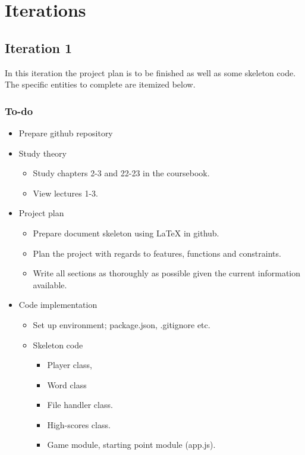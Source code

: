 \documentclass[12pt, letterpaper]{article}
\begin{document}
\section{Iterations}
\subsection{Iteration 1}

In this iteration the project plan is to be finished as well as some skeleton code. The specific entities to complete are itemized below.
\subsubsection{To-do}
\begin{itemize}
	\item Prepare github repository
	\item Study theory
	\begin{itemize}
		\item Study chapters 2-3 and 22-23 in the coursebook.
		\item View lectures 1-3.
	\end{itemize}
	\item Project plan
	\begin{itemize}
		\item Prepare document skeleton using LaTeX in github.
		\item Plan the project with regards to features, functions and constraints.
		\item Write all sections as thoroughly as possible given the current information available.
	\end{itemize}
	\item Code implementation
	\begin{itemize}
		\item Set up environment; package.json, .gitignore etc.
		\item Skeleton code
		\begin{itemize}
			\item Player class, 
			\item Word class
			\item File handler class. 
			\item High-scores class.
			\item Game module, starting point module (app.js).
		\end{itemize}
	\end{itemize}
\end{itemize}
\end{document}
